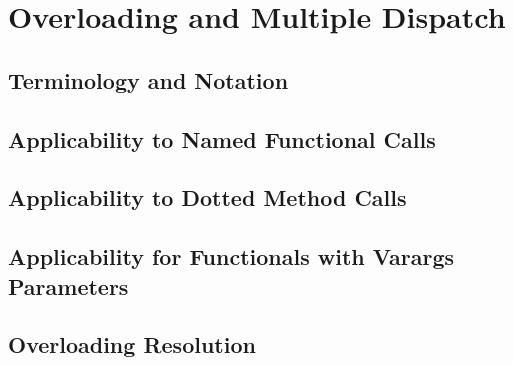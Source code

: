 %
%
%
%

\chapter{Overloading and Multiple Dispatch}

\section{Terminology and Notation}
\section{Applicability to Named Functional Calls}
\section{Applicability to Dotted Method Calls}
\section{Applicability for Functionals with Varargs
Parameters}
\section{Overloading Resolution}
